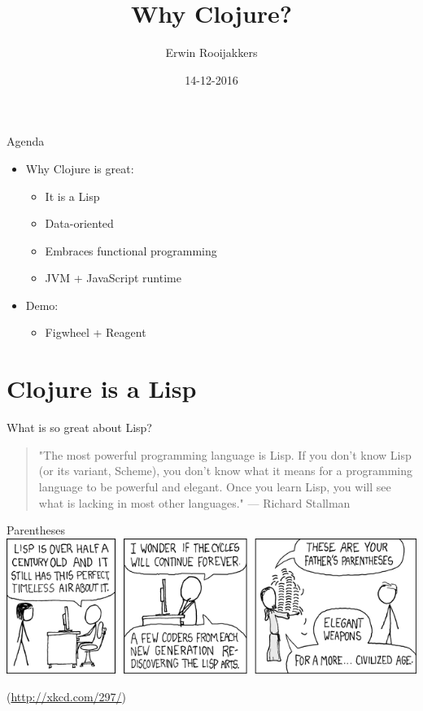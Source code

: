 \documentclass[presentation]{beamer}
\author{Erwin Rooijakkers}
\date{14-12-2016}
\title{Why Clojure?}
\begin{document}
\maketitle

\begin{frame}[label=sec-0-1]{Agenda}
\begin{itemize}
\item Why Clojure is great:
\begin{itemize}
\item It is a Lisp
\item Data-oriented
\item Embraces functional programming
\item JVM + JavaScript runtime
\end{itemize}
\item Demo:
\begin{itemize}
\item Figwheel + Reagent
\end{itemize}
\end{itemize}
\end{frame}

\section{Clojure is a Lisp}
\label{sec-1}

\begin{frame}[label=sec-1-1]{What is so great about Lisp?}
\begin{quotation}
"The most powerful programming language is Lisp. If you don't know Lisp (or its variant, Scheme), you don't know what it means for a programming language to be powerful and elegant. Once you learn Lisp, you will see what is lacking in most other languages." --- Richard Stallman
\end{quotation}
\end{frame}

\begin{frame}[label=sec-1-2]{Parentheses}
\includegraphics[width=.9\linewidth]{../images/lisp_cycles.png}

(\url{http://xkcd.com/297/})
\end{frame}
\end{document}
